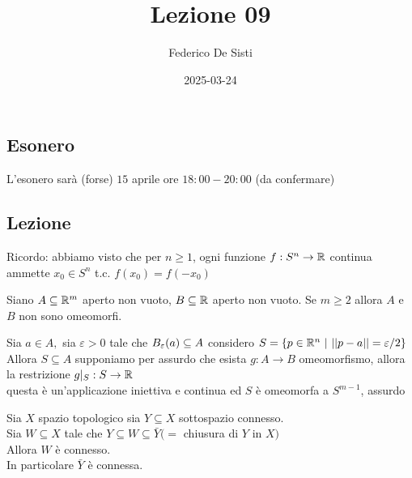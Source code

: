 \documentclass[12px]{article}
\title{Lezione 09}
\date{2025-03-24}
\author{Federico De Sisti}
\begin{document}
\maketitle
\newpage
\subsection{Esonero}
L'esonero sarà (forse) $15$ aprile ore $18:00 - 20:00$ (da confermare)\\
\subsection{Lezione}
Ricordo: abbiamo visto che per $n\geq 1$, ogni funzione  $f:S ^n \rightarrow\mathbb{R}$ continua ammette $x_0\in S^n$ t.c. $f(x_0) = f(-x_0)$\\
\begin{coro}[Invarianza del dominio con $n = 1$,  $m$ qualsiasi]
	Siano $A\subseteq \mathbb{R}^m$ aperto non vuoto, $B\subseteq \mathbb{R}$ aperto non vuoto. Se  $m\geq 2 $ allora  $A$ e $B$ non sono omeomorfi.
\end{coro}
\begin{dimo}
	Sia $a\in A,$ sia $\varepsilon > 0 $ tale che  $B_\varepsilon(a)\subseteq A$ considero $S = \{p\in\mathbb{R}^n\ | \ ||p-a|| = \varepsilon/2\}$ \\
	Allora  $S\subseteq A$ supponiamo per assurdo che esista  $g:A \rightarrow B$ omeomorfismo, allora la restrizione $g|_S:S \rightarrow \mathbb{R}$\\
	questa è un'applicazione iniettiva e continua ed $S$ è omeomorfa a $S^{m-1}$, assurdo
\end{dimo}
\begin{prop}
	Sia $ X$ spazio topologico sia $Y\subseteq X$ sottospazio connesso.\\
	Sia $W\subseteq X$ tale che  $Y\subseteq W\subseteq \bar Y (=$ chiusura di  $Y$ in $X)$\\
	Allora  $W$ è connesso.\\
	In particolare $\bar Y$ è connessa.
\end{prop}
\end{document}
